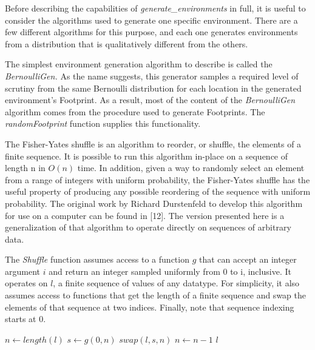 Before describing the capabilities of \textit{generate\_environments} in full, it is useful to consider the algorithms used to generate one specific environment. There are a few different algorithms for this purpose, and each one generates environments from a distribution that is qualitatively different from the others.

The simplest environment generation algorithm to describe is called the \textit{BernoulliGen.} As the name suggests, this generator samples a required level of scrutiny from the same Bernoulli distribution for each location in the generated environment's Footprint. As a result, most of the content of the \textit{BernoulliGen} algorithm comes from the procedure used to generate Footprints. The \textit{randomFootprint} function supplies this functionality.



The Fisher-Yates shuffle is an algorithm to reorder, or shuffle, the elements of a finite sequence. It is possible to run this algorithm in-place on a sequence of length n in $O(n)$ time. In addition, given a way to randomly select an element from a range of integers with uniform probability, the Fisher-Yates shuffle has the useful property of producing any possible reordering of the sequence with uniform probability. The original work by Richard Durstenfeld to develop this algorithm for use on a computer can be found in [12]. The version presented here is a generalization of that algorithm to operate directly on sequences of arbitrary data.

The \textit{Shuffle} function assumes access to a function $g$ that can accept an integer argument $i$ and return an integer sampled uniformly from 0 to i, inclusive. It operates on $l$, a finite sequence of values of any datatype. For simplicity, it also assumes access to functions that get the length of a finite sequence and swap the elements of that sequence at two indices. Finally, note that sequence indexing starts at 0.

\begin{algorithmic}

  \State $n\gets length(l)$	
      \State $s\gets g(0, n)$
      \State $swap(l, s, n)$
      \State $n\gets n - 1$
  \EndWhile
  \State \Return $l$
\EndFunction

\end{algorithmic}